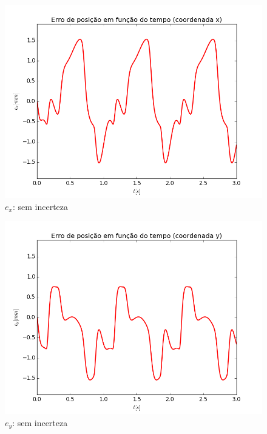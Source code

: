 \documentclass[]{politex}
\begin{document}
\begin{multicols}{2}
\begin{figure}[H]
	\centering
	\includegraphics[scale=0.42]{imagens/0/ex.png}  
	\caption{$e_x$: sem incerteza}
	\label{fig:ex_0}
\end{figure}
\begin{figure}[H]
	\centering
	\includegraphics[scale=0.42]{imagens/0/ey.png}  
	\caption{$e_y$: sem incerteza}
	\label{fig:ey_0}
\end{figure}
\end{multicols}
\end{document}
